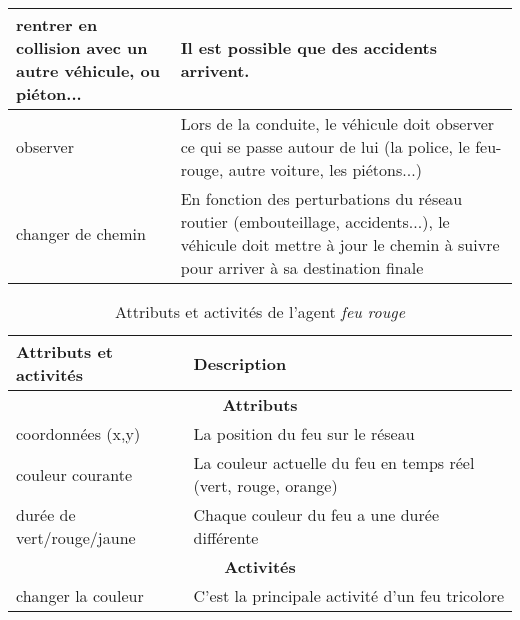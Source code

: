 \begin{table}[!ht]
\begin{center}
\begin{tabular}{|p{5cm}|p{10cm}|}
 \hline
 rentrer en collision avec un autre véhicule, ou piéton... & Il est possible que des accidents arrivent.
  \\
 \hline
 observer & Lors de la conduite, le véhicule doit observer ce qui se passe autour de lui (la police, le feu-rouge, autre voiture, les piétons...)
  \\
 \hline
 changer de chemin & En fonction des perturbations du réseau routier (embouteillage, accidents...), le véhicule doit mettre à jour le chemin à suivre pour arriver à sa destination finale
 \\
\hline
\end{tabular}
\end{center}
\end{table}


\begin{table}[!ht]
\begin{center}
\caption{Attributs et activités de l'agent \textit{feu rouge}\label{tab:feuRouge}}
\begin{tabular}{|p{5cm}|p{10cm}|}
\hline \bf Attributs et activités &  \bf Description\\
\hline
\multicolumn{2}{|c|}{\bf Attributs}
\\
\hline
 coordonnées  (x,y) & La position du feu sur le réseau
 \\
 \hline
 couleur courante & La couleur actuelle du feu en temps réel (vert, rouge, orange)
  \\ 
 \hline
 durée de vert/rouge/jaune  & Chaque couleur du feu a une durée différente
 \\
\hline
 \multicolumn{2}{|c|}{\bf Activités}
 \\
 \hline
 changer la couleur & C'est la principale activité d'un feu tricolore
 \\
\hline
\end{tabular}
\end{center}
\end{table}


